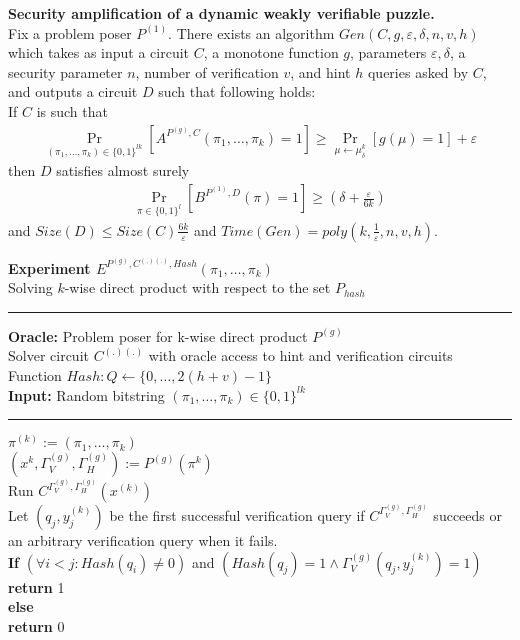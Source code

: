 %
%
%
%
\begin{theorem}{\textbf{Security amplification of a dynamic weakly verifiable puzzle.}}\\
  Fix a problem poser $P^{(1)}$.
  There exists an algorithm $Gen(C, g, \varepsilon, \delta, n, v, h)$ which takes as input a circuit $C$, a monotone function $g$, parameters
  $\varepsilon, \delta$, a security parameter $n$, number of verification $v$, and hint $h$ queries asked by $C$, and outputs a circuit $D$
  such that following holds: \\
  If $C$ is such that \\
  \begin{align*}
    \underset{(\pi_1, \dots, \pi_k) \in \{0,1\}^{lk}}{\Pr}[A^{P^{(g)}, C}(\pi_1, \dots, \pi_k) = 1] \geq \underset{\mu \leftarrow \mu_\delta^k}{\Pr}[g(\mu) = 1] + \varepsilon
  \end{align*}
  then $D$ satisfies almost surely
  \begin{align*}
    \underset{\pi \in \{0,1\}^{l}}{\Pr}[B^{P^{(1)},D}(\pi) = 1] \geq (\delta + \frac{\varepsilon}{6k})
  \end{align*}
  and $Size(D) \leq Size(C)\frac{6k}{\varepsilon}$ and $Time(Gen) = poly(k, \frac{1}{\varepsilon}, n, v, h)$.
\end{theorem}
%
%
%
%
\begin{codeblock}
  \textbf{Experiment $E^{P^{(g)}, C^{(.)(.)}, Hash}(\pi_1, \dots, \pi_k)$} \\
  Solving $k$-wise direct product with respect to the set $P_{hash}$
  \medskip

  \hrule

  \medskip
  \textbf{Oracle:} Problem poser for k-wise direct product $P^{(g)}$ \\
  \IndI Solver circuit $C^{(.)(.)}$ with oracle access to hint and verification circuits \\
  \IndI Function $Hash: Q \leftarrow \{0, \dots, 2(h+v) - 1\}$\\
  \textbf{Input:} Random bitstring $(\pi_1, \dots, \pi_k) \in \{0,1\}^{lk}$\\

  \medskip\hrule\medskip

  $\pi^{(k)} := \left(\pi_1, \dots, \pi_k \right)$\\
  $(x^{k}, \Gamma_V^{(g)}, \Gamma_H^{(g)}) := P^{(g)}(\pi^{k})$\\
  Run $C^{\Gamma_V^{(g)}, \Gamma_H^{(g)}} (x^{(k)})$ \\
  \IndI Let $(q_j,y_j^{(k)})$ be the first successful verification query if $C^{\Gamma_V^{(g)}, \Gamma_H^{(g)}}$ succeeds or \\
  \IndI an arbitrary verification query when it fails.\\

  \textbf{If} $(\forall i < j :  Hash(q_i) \neq 0 )$ and $( Hash(q_j) = 1 \land \Gamma_V^{(g)}(q_j, y_j^{(k)}) = 1)$ \\
  \IndI \textbf{return} 1\\
  \textbf{else}\\
  \IndI \textbf{return} 0\\
\end{codeblock}
